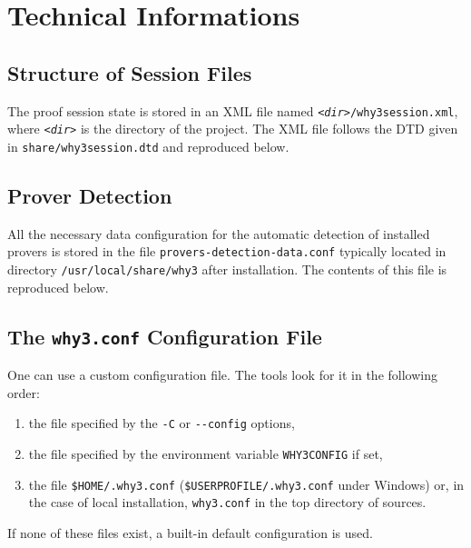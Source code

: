 \chapter{Technical Informations}


\section{Structure of Session Files}

The proof session state is stored in an XML file named
\texttt{\textsl{<dir>}/why3session.xml}, where \texttt{\textsl{<dir>}}
is the directory of the project.
The XML file follows the DTD given in \texttt{share/why3session.dtd} and reproduced below.



\section{Prover Detection}
\label{sec:proverdetecttiondata}

All the necessary data configuration for the automatic detection of
installed provers is stored in the file
\texttt{provers-detection-data.conf} typically located in directory
\verb|/usr/local/share/why3| after installation. The contents of this
file is reproduced below.
{\footnotesize

}

\section{The \texttt{why3.conf} Configuration File}
\label{sec:whyconffile}

One can use a custom configuration file. The \why
tools look for it in the following order:
\begin{enumerate}
\item the file specified by the \texttt{-C} or \texttt{-{}-config} options,
\item the file specified by the environment variable
  \texttt{WHY3CONFIG} if set,
\item the file \texttt{\$HOME/.why3.conf}
  (\texttt{\$USERPROFILE/.why3.conf} under Windows) or, in the case of
  local installation, \texttt{why3.conf} in the top directory of \why sources.
\end{enumerate}
If none of these files exist, a built-in default configuration is used.

